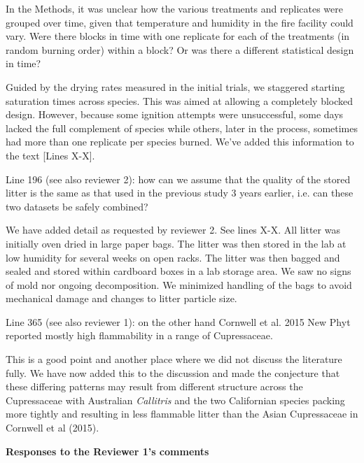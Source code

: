 \documentclass[letterpaper, 12pt]{letter}
\begin{document}
\begin{letter}{}
\begin{quoting}
  In the Methods, it was unclear how the various treatments and replicates were
  grouped over time, given that temperature and humidity in the fire facility
  could vary. Were there blocks in time with one replicate for each of the
  treatments (in random burning order) within a block? Or was there a different
  statistical design in time?
\end{quoting}

Guided by the drying rates measured in the initial trials, we staggered
starting saturation times across species. This was aimed at allowing a
completely blocked design. However, because some ignition attempts were
unsuccessful, some days lacked the full complement of species while others,
later in the process, sometimes had more than one replicate per species burned.
We've added this information to the text [Lines X-X].

\begin{quoting}
  Line 196 (see also reviewer 2): how can we assume that the quality of the
  stored litter is the same as that used in the previous study 3 years earlier,
  i.e. can these two datasets be safely combined?
\end{quoting}

We have added detail as requested by reviewer 2. See lines X-X. All litter was
initially oven dried in large paper bags. The litter was then stored in the lab
at low humidity for several weeks on open racks. The litter was then bagged and
sealed and stored within cardboard boxes in a lab storage area. We saw no signs
of mold nor ongoing decomposition. We minimized handling of the bags to avoid
mechanical damage and changes to litter particle size.


\begin{quoting}
  Line 365 (see also reviewer 1): on the other hand Cornwell et al. 2015 New
  Phyt reported mostly high flammability in a range of Cupressaceae.
\end{quoting}

This is a good point and another place where we did not discuss the literature fully. We
have now added this to the discussion and made the conjecture that these
differing patterns may result from different structure across the
Cupressaceae with Australian \emph{Callitris} and the two Californian species
packing more tightly and resulting in less flammable litter than the Asian
Cupressaceae in Cornwell et al (2015).


{\bf Responses to the Reviewer 1's comments}


\end{letter}
\end{document}
